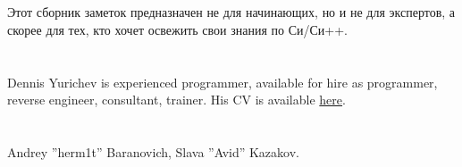 \documentclass[11pt,a4paper,oneside]{book}
\begin{document}
\chapter{}

Этот сборник заметок предназначен не для начинающих, но и не для экспертов, а скорее для тех, 
кто хочет освежить свои знания по Си/Си++.

\chapter{}

{Dennis Yurichev is experienced programmer, available for hire as programmer, reverse engineer, consultant, trainer. 
His CV is available \href{http://yurichev.com/Dennis_Yurichev.pdf}{here}.}

\chapter{}

{Andrey ''herm1t'' Baranovich, Slava ''Avid'' Kazakov}.

\mainmatter
























\clearpage
\printindex
\end{document}

